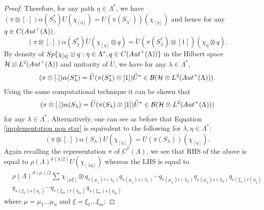 \documentclass{amsart}
\theoremstyle{plain}
\theoremstyle{definition}
\theoremstyle{remark}
\numberwithin{equation}{section}
\newcommand{\cal}{\mathcal}
\newcommand{\clb}{{\cal B}}
\newcommand{\clh}{{\cal H}}
\begin{document}
\begin{proof}
Therefore, for any path $\eta\in\Lambda^{\ast}$, we have $(\pi\otimes[.])\alpha(S_{\lambda}^{\ast})U(\chi_{[\eta]})=U(\pi(S_{\lambda^{\ast}}))(\chi_{[\eta]})$ and hence for any $q\in C({\rm Aut}^{+}(\Lambda))$,
\begin{displaymath}
  (\pi\otimes[.])\alpha(S_{\lambda}^{\ast})\widetilde{U}(\chi_{[\eta]}\otimes q)=\widetilde{U}(\pi(S_{\lambda}^{\ast})\otimes [1])(\chi_{\eta}\otimes q). 
\end{displaymath} 
By density of ${\rm Sp}\{\chi_{[\eta]}\otimes q:\eta\in\Lambda^{\ast}, q\in C({\rm Aut}^{+}(\Lambda))\}$ in the Hilbert space $\clh\otimes L^{2}({\rm Aut}^{+}(\Lambda))$ and unitarity of $\widetilde{U}$, we have for any $\lambda\in\Lambda^{\ast}$,
\begin{eqnarray}
\label{implementation star}
    (\pi\otimes[.])\alpha(S_{\lambda}^{\ast})=\widetilde{U}(\pi(S_{\lambda}^{\ast})\otimes[1])\widetilde{U}^{\ast}\in \clb(\clh\otimes L^{2}({\rm Aut}^{+}(\Lambda))).
\end{eqnarray}
Using the same computational technique it can be shown that 
\begin{eqnarray}
\label{implementation non star}
    (\pi\otimes[.])\alpha(S_{\lambda})=\widetilde{U}(\pi(S_{\lambda})\otimes[1])\widetilde{U}^{\ast}\in \clb(\clh\otimes L^{2}({\rm Aut}^{+}(\Lambda)))
\end{eqnarray}
for any $\lambda\in\Lambda^{\ast}$. Alternatively, one can see as before that Equation \ref{implementation non star} is equivalent to the following for $\lambda,\eta\in\Lambda^{\ast}$:
\begin{equation}
\label{non star}
    (\pi\otimes[.])\alpha(S_{\lambda})U(\chi_{[\eta]})=U(\pi(S_{\lambda}))(\chi_{[\eta]}).
\end{equation}
Again recalling the representation $\pi$ of $C^{\ast}(\Lambda)$, we see that RHS of the above is equal to $\rho(\Lambda)^{d(\lambda/2)}U(\chi_{[\lambda\eta]})$ whereas the LHS is equal to 
\begin{equation}
\label{temp}    
\begin{aligned}
    &\rho(\Lambda)^{d(\mu)/2}\sum_{}\chi_{[\mu\xi]}\otimes q_{r(\mu_{1})r(\lambda_{1})}q_{s(\mu_{1})s(\lambda_{1})}\cdots q_{r(\mu_{n})r(\lambda_{n})}q_{s(\mu_{n})s(\lambda_{n})}q_{r(\xi_{1})r(\eta_{1})}\\
    &q_{s(\xi_{1})s(\eta_{1})}\cdots 
    q_{r(\xi_{m})r(\eta_{m})}q_{s(\xi_{m})s(\eta_{m})}
\end{aligned}
\end{equation} 
where $\mu=\mu_{1}\ldots\mu_{n}$ and $\xi=\xi_{1}\ldots\xi_{m}$;

\end{proof}
\end{document}
